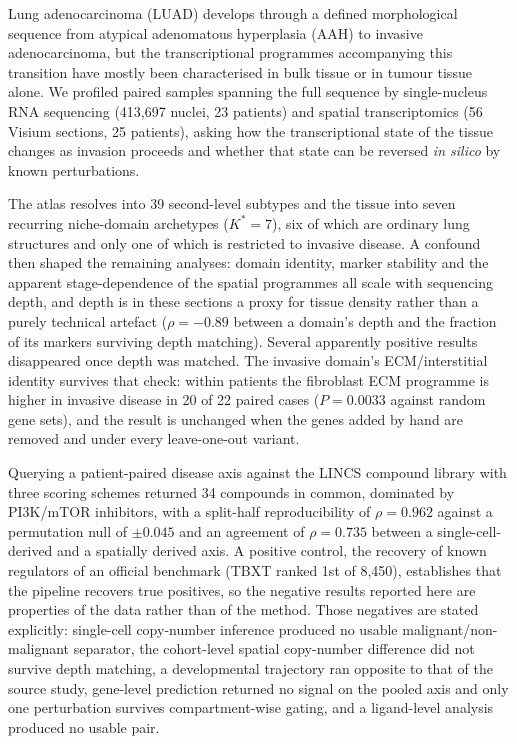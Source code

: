 Lung adenocarcinoma (LUAD) develops through a defined morphological sequence from atypical
adenomatous hyperplasia (AAH) to invasive adenocarcinoma, but the transcriptional programmes
accompanying this transition have mostly been characterised in bulk tissue or in tumour
tissue alone. We profiled paired samples spanning the full sequence by single-nucleus RNA
sequencing (413,697 nuclei, 23 patients) and spatial transcriptomics (56 Visium sections, 25
patients), asking how the transcriptional state of the tissue changes as invasion proceeds
and whether that state can be reversed \emph{in silico} by known perturbations.

The atlas resolves into 39 second-level subtypes and the tissue into seven recurring
niche-domain archetypes ($K^{*}=7$), six of which are ordinary lung structures and only one
of which is restricted to invasive disease. A confound then shaped the remaining analyses:
domain identity, marker stability and the apparent stage-dependence of the spatial programmes
all scale with sequencing depth, and depth is in these sections a proxy for tissue density
rather than a purely technical artefact ($\rho=-0.89$ between a domain's depth and the
fraction of its markers surviving depth matching). Several apparently positive results
disappeared once depth was matched. The invasive domain's ECM/interstitial identity survives
that check: within patients the fibroblast ECM programme is higher in invasive disease in 20
of 22 paired cases ($P=0.0033$ against random gene sets), and the result is unchanged when
the genes added by hand are removed and under every leave-one-out variant.

Querying a patient-paired disease axis against the LINCS compound library with three scoring
schemes returned 34 compounds in common, dominated by PI3K/mTOR inhibitors, with a
split-half reproducibility of $\rho=0.962$ against a permutation null of $\pm0.045$ and an
agreement of $\rho=0.735$ between a single-cell-derived and a spatially derived axis. A
positive control, the recovery of known regulators of an official benchmark (TBXT ranked 1st
of 8,450), establishes that the pipeline recovers true positives, so the negative results
reported here are properties of the data rather than of the method. Those negatives are
stated explicitly: single-cell copy-number inference produced no usable
malignant/non-malignant separator, the cohort-level spatial copy-number difference did not
survive depth matching, a developmental trajectory ran opposite to that of the source study,
gene-level prediction returned no signal on the pooled axis and only one perturbation
survives compartment-wise gating, and a ligand-level analysis produced no usable pair.
